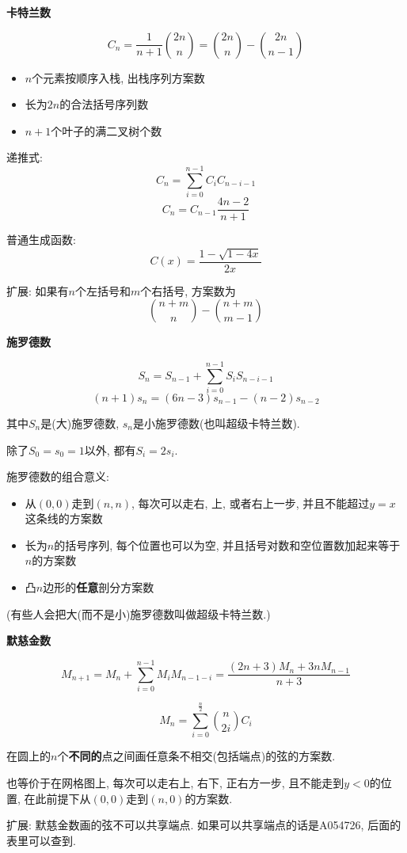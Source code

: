 \textbf{卡特兰数}

$$C_n = \frac 1 {n + 1}{2n\choose n} = {2n \choose n} - {2n \choose n - 1}$$

\begin{itemize}
	\item $n$个元素按顺序入栈, 出栈序列方案数
	\item 长为$2n$的合法括号序列数
	\item $n + 1$个叶子的满二叉树个数
\end{itemize}

递推式: 
$$C_n = \sum_{i = 0} ^ {n - 1} C_i C_{n - i - 1}$$
$$C_n = C_{n - 1} \frac {4n - 2} {n + 1}$$

普通生成函数:
$$C(x) = \frac {1 - \sqrt {1 - 4 x}} {2 x}$$

扩展: 如果有$n$个左括号和$m$个右括号, 方案数为
$${n + m \choose n} - {n + m \choose m - 1}$$

\textbf{施罗德数}

$$ S_n = S_{n-1} + \sum_{i = 0} ^ {n - 1} S_i S_{n - i - 1} $$
$$ (n + 1)s_n = (6n - 3)s_{n - 1} - (n - 2) s_{n - 2} $$

其中$S_n$是(大)施罗德数, $s_n$是小施罗德数(也叫超级卡特兰数).

除了$S_0 = s_0 = 1$以外, 都有$S_i = 2s_i$.

施罗德数的组合意义:
\begin{itemize}
	\item 从$(0, 0)$走到$(n, n)$, 每次可以走右, 上, 或者右上一步, 并且不能超过$y=x$这条线的方案数
	\item 长为$n$的括号序列, 每个位置也可以为空, 并且括号对数和空位置数加起来等于$n$的方案数
	\item 凸$n$边形的\textbf{任意}剖分方案数
\end{itemize}

(有些人会把大(而不是小)施罗德数叫做超级卡特兰数.)

\textbf{默慈金数}

$$ M_{n + 1} = M_n + \sum_{i = 0} ^ {n - 1} M_i M_{n - 1 - i} = \frac {(2n + 3)M_n + 3n M_{n - 1}} {n + 3} $$

$$ M_n = \sum_{i = 0} ^ {\frac n 2} {n \choose 2i} C_i $$

在圆上的$n$个\textbf{不同的}点之间画任意条不相交(包括端点)的弦的方案数.

也等价于在网格图上, 每次可以走右上, 右下, 正右方一步, 且不能走到$y<0$的位置, 在此前提下从$(0, 0)$走到$(n, 0)$的方案数.

扩展: 默慈金数画的弦不可以共享端点. 如果可以共享端点的话是A054726, 后面的表里可以查到.